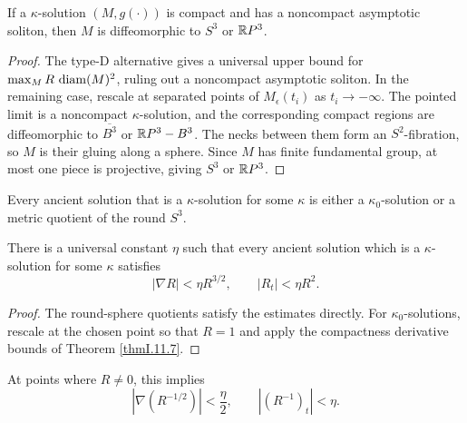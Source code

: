 \begin{lemma}
  \label{lem:kl-three-dimensional-solutions-compactness-kappa-solutions}
 \label{S3RP3}
If a $\kappa$-solution $(M,g(\cdot))$ is compact and has a noncompact
asymptotic soliton, then $M$ is diffeomorphic to $S^3$ or ${\mathbb R} P^3$.
\end{lemma}
\begin{proof}
\sketch The type-D alternative gives a universal upper bound for
$\max_M R\,\operatorname{diam}(M)^2$, ruling out a noncompact asymptotic soliton. In the
remaining case, rescale at separated points of $M_\epsilon(t_i)$ as
$t_i\to-\infty$. The pointed limit is a noncompact $\kappa$-solution, and the
corresponding compact regions are diffeomorphic to $\overline{B^3}$ or
${\mathbb R} P^3-B^3$. The necks between them form an $S^2$-fibration, so $M$ is their
gluing along a sphere. Since $M$ has finite fundamental group, at most one
piece is projective, giving $S^3$ or ${\mathbb R} P^3$.
\end{proof}

Every ancient solution that is a $\kappa$-solution for some $\kappa$ is either
a $\kappa_0$-solution or a metric quotient of the round $S^3$.

\begin{lemma}
  \label{lem:kl-three-dimensional-solutions-existence-kappa-solutions-4}
 \label{derivativeestimates}
There is a universal constant $\eta$ such that every ancient solution which is
a $\kappa$-solution for some $\kappa$ satisfies
\begin{equation} \label{derestimates}
|\nabla R|<\eta R^{3/2},\qquad |R_t|<\eta R^2.
\end{equation}
\end{lemma}
\begin{proof}
\sketch The round-sphere quotients satisfy the estimates directly. For
$\kappa_0$-solutions, rescale at the chosen point so that $R=1$ and apply the
compactness derivative bounds of Theorem \ref{thmI.11.7}.
\end{proof}

At points where $R\ne0$, this implies
\begin{equation}
\label{eqnderestimatesrinverse}
|\nabla(R^{-1/2})|<\frac\eta2,\qquad |(R^{-1})_t|<\eta.
\end{equation}

